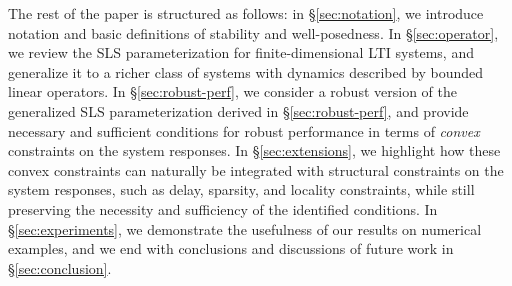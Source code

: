 The rest of the paper is structured as follows: in \S \ref{sec:notation}, we introduce notation and basic definitions of stability and well-posedness.  In \S \ref{sec:operator}, we review the SLS parameterization for finite-dimensional LTI systems, and generalize it to a richer class of systems with dynamics described by bounded linear operators.  In \S \ref{sec:robust-perf}, we consider a robust version of the generalized SLS parameterization derived in \S \ref{sec:robust-perf}, and provide necessary and sufficient conditions for robust performance in terms of \emph{convex} constraints on the system responses.  In \S \ref{sec:extensions}, we highlight how these convex constraints can naturally be integrated with structural constraints on the system responses, such as delay, sparsity, and locality constraints, while still preserving the necessity and sufficiency of the identified conditions.  In \S \ref{sec:experiments}, we demonstrate the usefulness of our results on numerical examples, and we end  with conclusions and discussions of future work in \S \ref{sec:conclusion}.